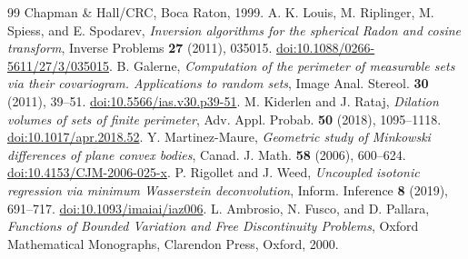 \begin{thebibliography}{99}
Chapman \& Hall/CRC, Boca Raton, 1999.
A. K. Louis, M. Riplinger, M. Spiess, and E. Spodarev,
\emph{Inversion algorithms for the spherical Radon and cosine transform},
Inverse Problems \textbf{27} (2011), 035015.
\href{https://doi.org/10.1088/0266-5611/27/3/035015}
{doi:10.1088/0266-5611/27/3/035015}.
B. Galerne, \emph{Computation of the perimeter of measurable sets via
their covariogram. Applications to random sets},
Image Anal. Stereol. \textbf{30} (2011), 39--51.
\href{https://doi.org/10.5566/ias.v30.p39-51}
{doi:10.5566/ias.v30.p39-51}.
M. Kiderlen and J. Rataj, \emph{Dilation volumes of sets of finite perimeter},
Adv. Appl. Probab. \textbf{50} (2018), 1095--1118.
\href{https://doi.org/10.1017/apr.2018.52}{doi:10.1017/apr.2018.52}.
Y. Martinez-Maure, \emph{Geometric study of Minkowski differences of
plane convex bodies}, Canad. J. Math. \textbf{58} (2006), 600--624.
\href{https://doi.org/10.4153/CJM-2006-025-x}{doi:10.4153/CJM-2006-025-x}.
P. Rigollet and J. Weed, \emph{Uncoupled isotonic regression via minimum
Wasserstein deconvolution}, Inform. Inference \textbf{8} (2019), 691--717.
\href{https://doi.org/10.1093/imaiai/iaz006}{doi:10.1093/imaiai/iaz006}.
L. Ambrosio, N. Fusco, and D. Pallara, \emph{Functions of Bounded
Variation and Free Discontinuity Problems}, Oxford Mathematical
Monographs, Clarendon Press, Oxford, 2000.
\end{thebibliography}
